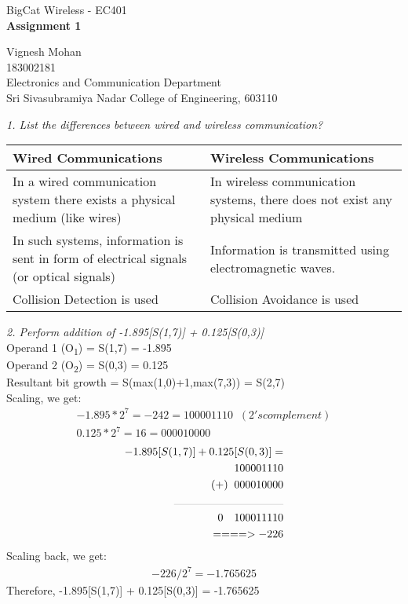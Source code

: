 \documentclass[a4paper]{article}
\begin{document}

\Large
 \begin{center}
BigCat Wireless - EC401\\
\textbf{Assignment 1}

\hspace{10pt}

\large
Vignesh Mohan\\
\smallskip
\small
183002181\\
\small
Electronics and Communication Department\\
\small
Sri Sivasubramiya Nadar College of Engineering, 603110\\
\end{center}

\hspace{10pt}
\normalsize

\textit{1. List the differences between wired and wireless communication?}\\
\bigskip
\begin{tabular}{| p{0.5\linewidth} | p{0.5\linewidth} |}
 \hline
 \textbf{Wired Communications} & \textbf{Wireless Communications} \\ 
 \hline
 In a wired communication system there exists a physical medium (like wires) & In wireless communication systems, there does not exist any physical medium\\  
 \hline
 In such systems, information is sent in form of electrical signals (or optical signals) & Information is transmitted using electromagnetic waves.
 \\
  \hline
   Collision Detection is used & Collision Avoidance is used \\
\hline
\end{tabular}

\bigskip
\textit{2. Perform addition of -1.895[S(1,7)] + 0.125[S(0,3)]}\\
\bigskip
Operand 1 (O\textsubscript1) = S(1,7) = -1.895\\
Operand 2 (O\textsubscript2) = S(0,3) = 0.125\\
Resultant bit growth = S(max(1,0)+1,max(7,3)) = S(2,7)\\
\medskip
Scaling, we get:
\begin{gather*} 
-1.895 * 2^7 = -242 = 100001110 \;\; (2's complement)\\
0.125	* 2^7 = 16 = 000010000
\end{gather*}
\vspace{-20pt}
\begin{align*} 
-1.895[S(1,7)] + 0.125[S(0,3)] =\\ 
100001110\\
(+)  \;\;000010000\\
\rule{100pt}{0.1pt}\\
0\hspace{10pt}100011110\\
====> -226
\end{align*}
Scaling back, we get:
\begin{gather*} 
-226/2^7 = -1.765625
\end{gather*}
Therefore, -1.895[S(1,7)] + 0.125[S(0,3)] = -1.765625
\end{document}
